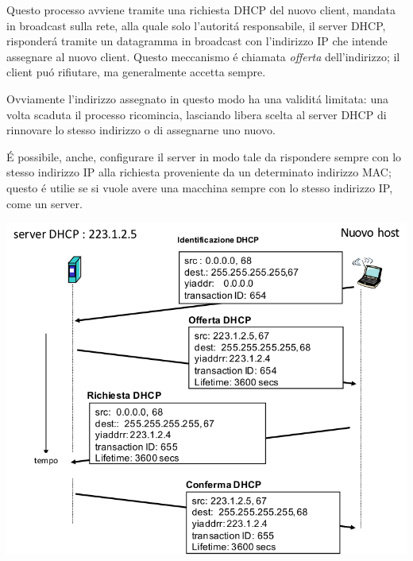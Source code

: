 \documentclass[12pt]{article}
\begin{document}
Questo processo avviene tramite una richiesta DHCP del nuovo client, mandata in broadcast sulla rete, alla quale solo 
l'autorit\'a responsabile, il server DHCP, risponder\'a tramite un datagramma in broadcast con l'indirizzo IP che intende 
assegnare al nuovo client. Questo meccanismo \'e chiamata \textit{offerta} dell'indirizzo; il client pu\'o rifiutare, ma 
generalmente accetta sempre.

Ovviamente l'indirizzo assegnato in questo modo ha una validit\'a limitata: una volta scaduta il processo ricomincia, 
lasciando libera scelta al server DHCP di rinnovare lo stesso indirizzo o di assegnarne uno nuovo.

\'E possibile, anche, configurare il server in modo tale da rispondere sempre con lo stesso indirizzo IP alla 
richiesta proveniente da un determinato indirizzo MAC; questo \'e utilie se si vuole avere una macchina sempre con lo
stesso indirizzo IP, come un server.
\begin{center}
    \includegraphics[scale=0.59]{livello_di_rete-img5.png}
\end{center}
\end{document}
